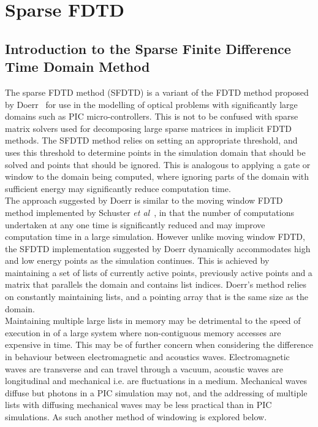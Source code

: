 \section{Sparse FDTD}
\subsection{Introduction to the Sparse Finite Difference Time Domain Method}
The sparse FDTD method (SFDTD) is a variant of the FDTD method proposed by Doerr~\cite{Doerr2013} for use in the modelling of optical problems with significantly large domains such as PIC micro-controllers. This is not to be confused with sparse matrix solvers used for decomposing large sparse matrices in implicit FDTD methods. The SFDTD method relies on setting an appropriate threshold, and uses this threshold to determine points in the simulation domain that should be solved and points that should be ignored. This is analogous to applying a gate or window to the domain being computed, where ignoring parts of the domain with sufficient energy may significantly reduce computation time.\\

The approach suggested by Doerr is similar to the moving window FDTD method implemented by Schuster \textit{et al}~\cite{Schuster2004}, in that the number of computations undertaken at any one time is significantly reduced and may improve computation time in a large simulation. However unlike moving window FDTD, the SFDTD implementation suggested by Doerr dynamically accommodates high and low energy points as the simulation continues. This is achieved by maintaining a set of lists of currently active points, previously active points and a matrix that parallels the domain and contains list indices. Doerr's method relies on constantly maintaining lists, and a pointing array that is the same size as the domain.\\

Maintaining multiple large lists in memory may be detrimental to the speed of execution in of a large system where non-contiguous memory accesses are expensive in time. This may be of further concern when considering the difference in behaviour between electromagnetic and acoustics waves. Electromagnetic waves are transverse and can travel through a vacuum, acoustic waves are longitudinal and mechanical i.e. are fluctuations in a medium. Mechanical waves diffuse but photons in a PIC simulation may not, and the addressing of multiple lists with diffusing mechanical waves may be less practical than in PIC simulations. As such another method of windowing is explored below. \\

